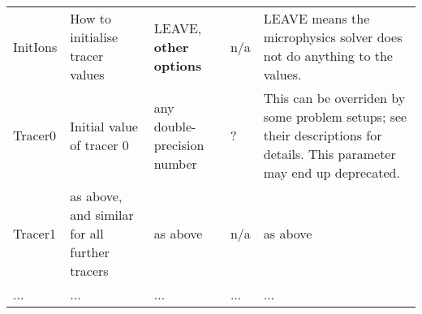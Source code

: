 \documentclass[a4paper,11pt]{report}
\begin{document}
\begin{sidewaystable}
\begin{tabular}{| p{2cm} | p{5cm} | p{5cm} | l | p{7cm} |}
    \\
    InitIons & How to initialise tracer values & LEAVE, \textbf{other options} & n/a & LEAVE means the microphysics solver does not do anything to the values.
    \\
    Tracer0 & Initial value of tracer 0 & any double-precision number & ? & This can be overriden by some problem setups; see their descriptions for details.  This parameter may end up deprecated.
    \\
    Tracer1 & as above, and similar for all further tracers & as above & n/a & as above
    \\
    ... & ... & ... & ... & ... \\
    \hline
  \end{tabular}
  \caption{}
  \label{tab:plist}
\end{sidewaystable}
\end{document}
